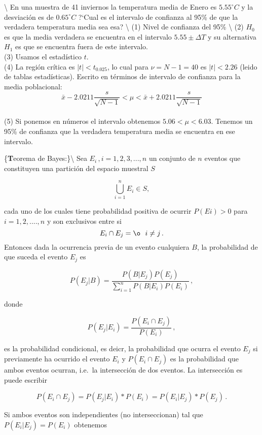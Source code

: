 \documentclass[
]{agujournal2019}
\begin{document}
\textbackslash{} En una muestra de 41
inviernos la temperatura media de Enero es \(5.55^\circ{C}\) y la
desviación es de \(0.65^\circ{C}\) ?{}`Cual es el intervalo de confianza
al 95\% de que la verdadera temperatura media sea esa? \textbackslash{}
(1) Nivel de confianza del 95\% \textbackslash{} (2) \(H_0\) es que la
media verdadera se encuentra en el intervalo \(5.55\pm \Delta{T}\) y su
alternativa \(H_1\) es que se encuentra fuera de este intervalo.\\
(3) Usamos el estadístico \(t\).\\
(4) La región crítica es \(|t|<t_{0.025}\), lo cual para \(\nu=N-1=40\)
es \(|t|<2.26\) (leido de tablas estadísticas). Escrito en términos de
intervalo de confianza para la media poblacional:
\[\bar{x}-2.0211\frac{s}{\sqrt{N-1}}<\mu<\bar{x}+2.0211\frac{s}{\sqrt{N-1}}  \]\\
(5) Si ponemos en números el intervalo obtenemos \(5.06<\mu<6.03\).
Tenemos un 95\% de confianza que la verdadera temperatura media se
encuentra en ese intervalo.

\vspace{0.5cm}

\{\noindent \textbf Teorema de Bayes:\}\textbackslash{} Sea
\(E_i\,,i=1,2,3,...,n\) un conjunto de \(n\) eventos que constituyen una
partición del espacio muestral \(S\)

\[\bigcup^n_{i=1}E_i\in S,\]

cada uno de los cuales tiene probabilidad positiva de ocurrir
\(P(Ei)>0\) para \(i=1,2,....,n\) y son exclusivos entre si
\[E_i\cap E_j=\o \,\,\,\,i\ne j\,.\] Entonces dada la ocurrencia previa
de un evento cualquiera \(B\), la probabilidad de que suceda el evento
\(E_j\) es

\begin{equation}
P(E_j|B)=\frac{P(B|E_j)P(E_j)}{\sum^n_{i=1}P(B|E_i)P(E_i)}\,,
\end{equation}

donde

\[P(E_j|E_i)=\frac{P(E_i\cap E_j)}{P(E_i)}\,,\]

es la probabilidad condicional, es deicr, la probabilidad que ocurra el
evento \(E_j\) si previamente ha ocurrido el evento \(E_i\) y
\(P(E_i \cap E_j)\) es la probabilidad que ambos eventos ocurran,
i.e.~la intersección de dos eventos. La intersección es puede escribir

\[P(E_i\cap E_j)=P(E_j|E_i)*P(E_i)=P(E_i|E_j)*P(E_j)\,.\]

Si ambos eventos son independientes (no interseccionan) tal que
\(P(E_i|E_j)=P(E_i)\) obtenemos
\end{document}
